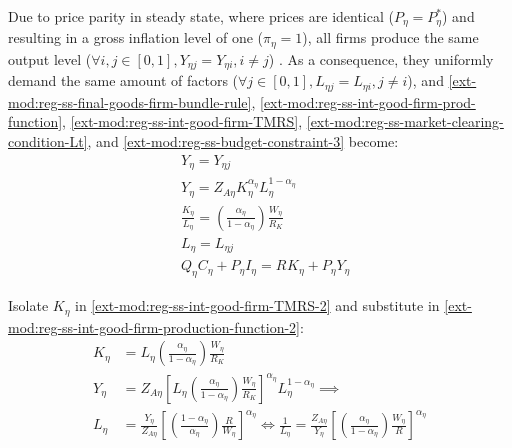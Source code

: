 \documentclass[../thesis.tex]{subfiles}
\begin{document}
Due to price parity in steady state, where prices are identical ($P_{\eta} = P_{\eta}^{\ast}$) and resulting in a gross inflation level of one ($\pi_{\eta} = 1$), all firms produce the same output level ($\forall i, j \in [0,1], Y_{\eta j} = Y_{\eta i}, i \neq j$) \cite[Lecture 13, p.12]{solis-garcia_ucb_2022}. As a consequence, they uniformly demand the same amount of factors ($\forall j \in [0,1], L_{\eta j} = L_{\eta i}, j \neq i$), and \ref{ext-mod:reg-ss-final-goods-firm-bundle-rule}, \ref{ext-mod:reg-ss-int-good-firm-prod-function}, \ref{ext-mod:reg-ss-int-good-firm-TMRS}, \ref{ext-mod:reg-ss-market-clearing-condition-Lt}, and \ref{ext-mod:reg-ss-budget-constraint-3} become:
\begin{align}
	& Y_{\eta} = Y_{\eta j} \label{ext-mod:reg-ss-final-goods-firm-bundle-rule-2} \\
	& Y_{\eta} = Z_{A\eta} K_{\eta}^{\alpha_{\eta}} L_{\eta}^{1-{\alpha_{\eta}}} \label{ext-mod:reg-ss-int-good-firm-production-function-2} \\
	& \frac{K_{\eta}}{L_{\eta}} = \left( \frac{{\alpha_{\eta}}}{1-\alpha_{\eta}} \right) \frac{W_{\eta}}{R_{K}} \label{ext-mod:reg-ss-int-good-firm-TMRS-2} \\
	& L_{\eta} = L_{\eta j} \label{ext-mod:reg-ss-market-clearing-condition-Lt-2} \\
	& Q_{\eta} C_{\eta} + P_{\eta} I_{\eta} = R_{} K_{\eta} + P_{\eta} Y_{\eta} \label{ext-mod:reg-ss-budget-constraint-4}
\end{align}


Isolate $K_{\eta}$ in \ref{ext-mod:reg-ss-int-good-firm-TMRS-2} and substitute in \ref{ext-mod:reg-ss-int-good-firm-production-function-2}:
\begin{align}
	K_{\eta} &= L_{\eta} \left( \frac{{\alpha_{\eta}}}{1-\alpha_{\eta}} \right) \frac{W_{\eta}}{R_{K}} \nonumber \\
	Y_{\eta} &= Z_{A\eta} \left[ L_{\eta} \left( \frac{{\alpha_{\eta}}}{1-\alpha_{\eta}} \right) \frac{W_{\eta}}{R_{K}} \right]^{\alpha_{\eta}} L_{\eta}^{1-{\alpha_{\eta}}} \implies \nonumber \\
	L_{\eta} &= \frac{Y_{\eta}}{Z_{A\eta}} \left[ \left( \frac{1-\alpha_{\eta}}{{\alpha_{\eta}}} \right) \frac{R}{W_{\eta}} \right]^{\alpha_{\eta}} \iff %
	\frac{1}{L_{\eta}} = \frac{Z_{A\eta}}{Y_{\eta}} \left[ \left( \frac{{\alpha_{\eta}}}{1-\alpha_{\eta}} \right) \frac{W_{\eta}}{R} \right]^{\alpha_{\eta}} \label{ext-mod:reg-ss-int-good-firm-production-function-3}
\end{align}
\end{document}
